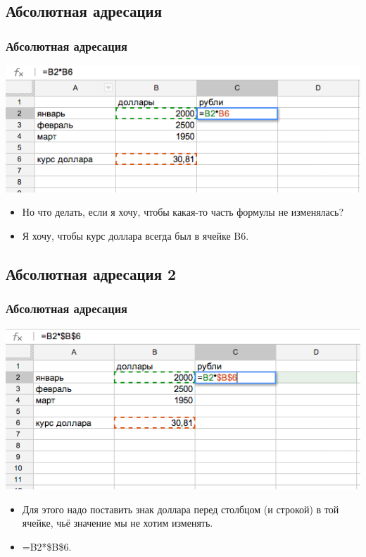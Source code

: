 \documentclass[compress,red]{beamer}
\begin{document}
\subsection{Абсолютная адресация}
\begin{frame}[fragile]
  \frametitle{Абсолютная адресация}
  \centerline{\includegraphics[width=1.0\textwidth]{images/10.png}}
  \begin{itemize}
    \item Но что делать, если я хочу, чтобы какая-то часть формулы не изменялась?
    \item Я хочу, чтобы курс доллара всегда был в ячейке B6.
  \end{itemize}
\end{frame}

\subsection{Абсолютная адресация 2}
\begin{frame}[fragile]
  \frametitle{Абсолютная адресация}
  \centerline{\includegraphics[width=1.0\textwidth]{images/11.png}}
  
  \begin{itemize}
    \item Для этого надо поставить знак доллара перед столбцом (и строкой) в той ячейке, чьё значение мы не хотим изменять.
    \item =B2*\$B\$6.
  \end{itemize}
\end{frame}
\end{document}
